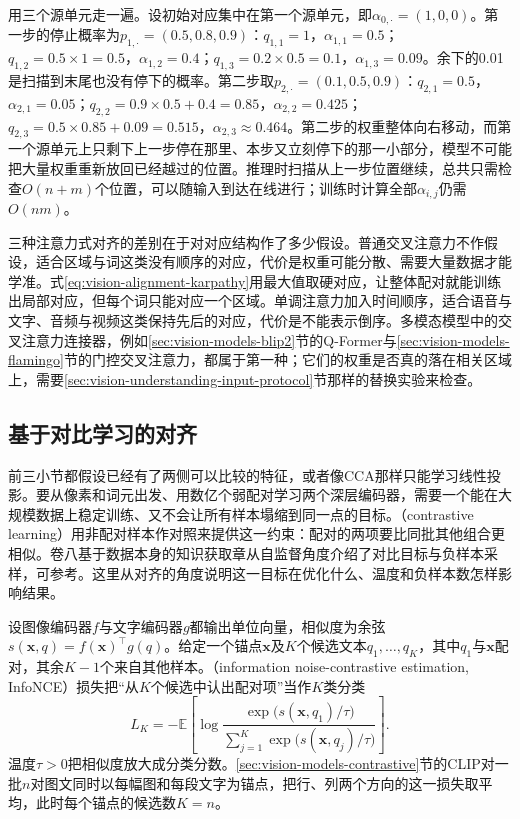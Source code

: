 用三个源单元走一遍。设初始对应集中在第一个源单元，即$\alpha_{0,\cdot}=(1,0,0)$。第一步的停止概率为$p_{1,\cdot}=(0.5,0.8,0.9)$：$q_{1,1}=1$，$\alpha_{1,1}=0.5$；$q_{1,2}=0.5\times1=0.5$，$\alpha_{1,2}=0.4$；$q_{1,3}=0.2\times0.5=0.1$，$\alpha_{1,3}=0.09$。余下的0.01是扫描到末尾也没有停下的概率。第二步取$p_{2,\cdot}=(0.1,0.5,0.9)$：$q_{2,1}=0.5$，$\alpha_{2,1}=0.05$；$q_{2,2}=0.9\times0.5+0.4=0.85$，$\alpha_{2,2}=0.425$；$q_{2,3}=0.5\times0.85+0.09=0.515$，$\alpha_{2,3}\approx0.464$。第二步的权重整体向右移动，而第一个源单元上只剩下上一步停在那里、本步又立刻停下的那一小部分，模型不可能把大量权重重新放回已经越过的位置。推理时扫描从上一步位置继续，总共只需检查$O(n+m)$个位置，可以随输入到达在线进行；训练时计算全部$\alpha_{i,j}$仍需$O(nm)$。

三种注意力式对齐的差别在于对对应结构作了多少假设。普通交叉注意力不作假设，适合区域与词这类没有顺序的对应，代价是权重可能分散、需要大量数据才能学准。式\eqref{eq:vision-alignment-karpathy}用最大值取硬对应，让整体配对就能训练出局部对应，但每个词只能对应一个区域。单调注意力加入时间顺序，适合语音与文字、音频与视频这类保持先后的对应，代价是不能表示倒序。多模态模型中的交叉注意力连接器，例如\ref{sec:vision-models-blip2}节的Q-Former与\ref{sec:vision-models-flamingo}节的门控交叉注意力，都属于第一种；它们的权重是否真的落在相关区域上，需要\ref{sec:vision-understanding-input-protocol}节那样的替换实验来检查。

\subsection{基于对比学习的对齐}
\label{sec:vision-alignment-contrastive}

前三小节都假设已经有了两侧可以比较的特征，或者像CCA那样只能学习线性投影。要从像素和词元出发、用数亿个弱配对学习两个深层编码器，需要一个能在大规模数据上稳定训练、又不会让所有样本塌缩到同一点的目标。（contrastive learning）用非配对样本作对照来提供这一约束：配对的两项要比同批其他组合更相似。卷八基于数据本身的知识获取章从自监督角度介绍了对比目标与负样本采样，可参考。这里从对齐的角度说明这一目标在优化什么、温度和负样本数怎样影响结果。

设图像编码器$f$与文字编码器$g$都输出单位向量，相似度为余弦$s(\bm x,q)=f(\bm x)^\top g(q)$。给定一个锚点$\bm x$及$K$个候选文本$q_1,\ldots,q_K$，其中$q_1$与$\bm x$配对，其余$K-1$个来自其他样本。（information noise-contrastive estimation, InfoNCE）损失把“从$K$个候选中认出配对项”当作$K$类分类
\begin{equation}
  L_K=-\mathbb E\left[\log
   \frac{\exp\bigl(s(\bm x,q_1)/\tau\bigr)}
        {\sum_{j=1}^{K}\exp\bigl(s(\bm x,q_j)/\tau\bigr)}\right].
  \label{eq:vision-alignment-infonce}
\end{equation}
温度$\tau>0$把相似度放大成分类分数。\ref{sec:vision-models-contrastive}节的CLIP对一批$n$对图文同时以每幅图和每段文字为锚点，把行、列两个方向的这一损失取平均，此时每个锚点的候选数$K=n$。

